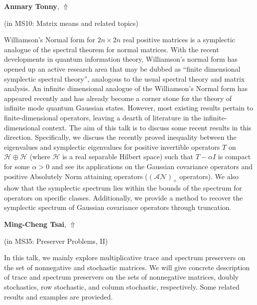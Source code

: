 \documentclass[ILAS2025-program.tex]{subfiles}
\begin{document}
\hypertarget{down0057}{}\begin{ilasabstract}
    
\textbf{Anmary Tonny},  \hfill \hyperlink{up0057}{$\Uparrow$}
    
    
(in {\color{mstitle}MS10: Matrix means and related topics})
        
\mtskip
    Williamson's Normal form for $2n\times 2n$ real positive matrices is a symplectic analogue of the spectral theorem for normal matrices. With the recent developments in quantum information theory,  Williamson's normal form has opened up an active research area that may be dubbed as ``finite dimensional symplectic spectral theory'', analogous to the usual spectral theory and matrix analysis. An infinite dimensional analogue of the Williamson's Normal form has appeared recently and has already become a corner stone for the theory of infinite mode quantum Gaussian states. However, most existing results pertain to finite-dimensional operators, leaving a dearth of literature in the infinite-dimensional context. The aim of this talk is to discuss some recent results in this direction. Specifically, we discuss the recently proved inequality between the eigenvalues and symplectic eigenvalues for positive invertible operators $T$ on $\mathcal{H} \oplus \mathcal{H}$ (where $\mathcal{H}$ is a real separable Hilbert space) such that $T- \alpha I$ is compact for some $\alpha > 0$ and see its applications on the Gaussian covariance operators and positive Absolutely Norm attaining operators ($(\mathcal{AN})_+$ operators). We also show that the symplectic spectrum lies within the bounds of the spectrum for operators on specific classes. Additionally, we provide a method to recover the symplectic spectrum of Gaussian covariance operators through truncation.
\end{ilasabstract}
    

\hypertarget{down0281}{}\begin{ilasabstract}
    
\textbf{Ming-Cheng Tsai},  \hfill \hyperlink{up0281}{$\Uparrow$}
    
    
(in {\color{mstitle}MS35: Preserver Problems, II})
        
\mtskip
    In this talk, we mainly explore multiplicative trace and spectrum preservers on the set of nonnegative and stochastic matrices. We will give concrete description of trace and spectrum preservers on the sets of nonnegative matrices, doubly stochastics, row stochastic, and column stochastic, respectively. Some related results and examples are provieded.

\end{ilasabstract}
    
\end{document}
